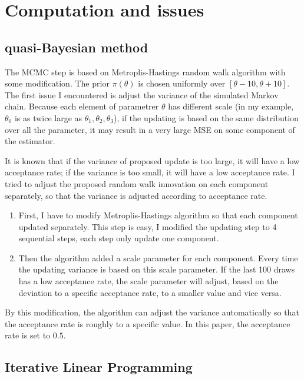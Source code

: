 \documentclass[12pt]{article}
\theoremstyle{plain} \newtheorem{theorem}{Theorem}
\theoremstyle{definition} \newtheorem{definition}{Definition}
\begin{document}
\section{Computation and issues}
\label{sec:computation-issues}

\subsection{quasi-Bayesian method}
The MCMC step is based on Metroplis-Hastings random walk algorithm with some modification. The prior $\pi(\theta)$ is chosen uniformly over $[\theta-10, \theta+10]$.
The first issue I encountered is adjust the variance of the simulated Markov chain. Because each element of parametrer $\theta$ has different scale (in my example, $\theta_0$ is as twice large as $\theta_1,\theta_2,\theta_3$), if the updating is based on the same distribution over all the parameter, it may result in a very large MSE on some component of the estimator.

It is known that if the variance of proposed update is too large, it will have a low acceptance rate; if the variance is too small, it will have a low acceptance rate. I tried to adjust the proposed random walk innovation on each component separately, so that the variance is adjusted according to acceptance rate.

\begin{enumerate}
    \item First, I have to modify Metroplis-Hastings algorithm so that each component updated separately. This step is easy, I modified the updating step to 4 sequential steps, each step only update one component.
    \item Then the algorithm added a scale parameter for each component. Every time the updating variance is based on this scale parameter. If the last 100 draws has a low acceptance rate, the scale parameter will adjust, based on the deviation to a specific acceptance rate, to a smaller value and vice versa.
\end{enumerate}

By this modification, the algorithm can adjust the variance automatically so that the acceptance rate is roughly to a specific value. In this paper, the acceptance rate is set to $0.5$.

\subsection{Iterative Linear Programming}
\label{sec:iter-line-progr}
\end{document}
